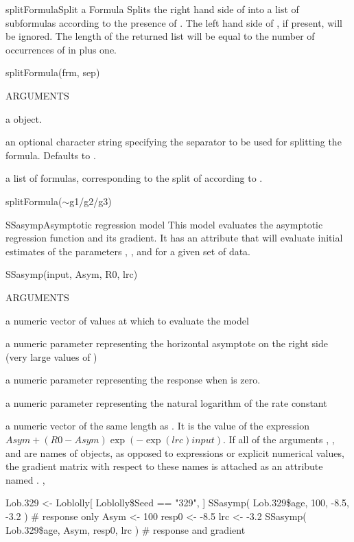 \documentclass[pdftex]{article} \usepackage{url,graphicx}
\renewcommand{\Twiddle}{\mbox{\(\sim\)}}
\begin{document}
\begin{Helpfile}{splitFormula}{Split a Formula}
Splits the right hand side of  into a list of subformulas
according to the presence of . The left hand side of
, if present, will be ignored. The length of the returned
list will be equal to the number of occurrences of  in
 plus one.
\begin{Example}
splitFormula(frm, sep)
\end{Example}
\begin{Argument}{ARGUMENTS}
\item[\Co{form:}]
a  object.
\item[\Co{sep:}]
an optional character string specifying the separator to be
used for splitting the formula. Defaults to . 
\end{Argument}
a list of formulas, corresponding to the split of 
according to .
\need 15pt
\vspace{-16pt} 
\begin{Example}
splitFormula(\Twiddle g1/g2/g3)
\end{Example}
\end{Helpfile}
\begin{Helpfile}{SSasymp}{Asymptotic regression model}
This  model evaluates the asymptotic regression
function and its gradient.  It has an  attribute that
will evaluate initial estimates of the parameters , ,
and  for a given set of data.
\begin{Example}
SSasymp(input, Asym, R0, lrc)
\end{Example}
\begin{Argument}{ARGUMENTS}
\item[\Co{input:}]
a numeric vector of values at which to evaluate the model
\item[\Co{Asym:}]
a numeric parameter representing the horizontal asymptote on
the right side (very large values of )
\item[\Co{R0:}]
a numeric parameter representing the response when
 is zero.
\item[\Co{lrc:}]
a numeric parameter representing the natural logarithm of
the rate constant
\end{Argument}
a numeric vector of the same length as .  It is the value of
the expression $Asym+(R0-Asym)\exp(-\exp(lrc)input)$.  If all of
the arguments , , and  are
names of objects, as opposed to expressions or explicit numerical
values, the gradient matrix with respect to these names is attached as
an attribute named .
, 
\need 15pt
\vspace{-16pt} 
\begin{Example}
Lob.329 <- Loblolly[ Loblolly\$Seed == "329", ]
SSasymp( Lob.329\$age, 100, -8.5, -3.2 )  # response only
Asym <- 100
resp0 <- -8.5
lrc <- -3.2
SSasymp( Lob.329\$age, Asym, resp0, lrc ) # response and gradient
\end{Example}
\end{Helpfile}
\end{document}
